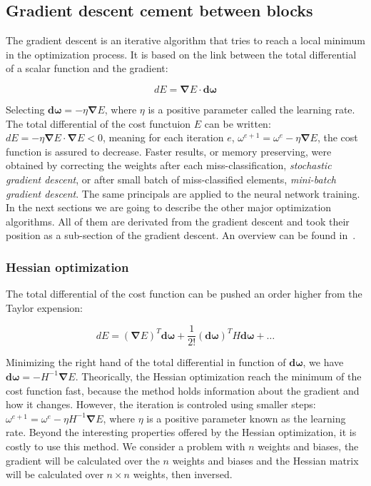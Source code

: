 \documentclass[final, paper=letter,5p,times,twocolumn]{elsarticle}
\begin{document}
\subsection{Gradient descent cement between blocks}
The gradient descent is an iterative algorithm that tries to reach a local minimum in the optimization process. It is based on the link between the total differential of a scalar function and the gradient:

$$
dE = \bm{\nabla}E \cdot \bm{d \omega}
$$

Selecting $\bm{d\omega} = -\eta \bm{\nabla}E$, where $\eta$ is a positive parameter called the learning rate. The total differential of the cost functuion $E$ can be written: $dE = -\eta \bm{\nabla}E \cdot \bm{\nabla}E < 0$, meaning for each iteration $e$, $\omega^{e+1} = \omega^{e} - \eta \bm{\nabla} E$, the cost function is assured to decrease. 
Faster results, or memory preserving, were obtained by correcting the weights after each miss-classification, {\it stochastic gradient descent}, or after small batch of miss-classified elements, {\it mini-batch gradient descent}. The same principals are applied to the neural network training.\\
In the next sections we are going to describe the other major optimization algorithms. All of them are derivated from the gradient descent and took their position as a sub-section of the gradient descent. An overview can be found in~\cite{DBLP:Ruder16}.

\subsubsection{Hessian optimization}

The total differential of the cost function can be pushed an order higher from the Taylor expension:

$$
dE = (\bm{\nabla}E)^{T} \bm{d \omega} + \frac{1}{2!}(\bm{d \omega})^{T}H\bm{d \omega} + \dots
$$

Minimizing the right hand of the total differential in function of $\bm{d \omega}$, we have $\bm{d \omega} = - H^{-1} \bm{\nabla}E$. Theorically, the Hessian optimization reach the minimum of the cost function fast, because the method holds information about the gradient and how it changes. However, the iteration is controled using smaller steps: $\omega^{e+1} = \omega^{e} - \eta  H^{-1} \bm{\nabla}E$, where $\eta$ is a positive parameter known as the learning rate. Beyond the interesting properties offered by the Hessian optimization, it is costly to use this method. We consider a problem with $n$ weights and biases, the gradient will be calculated over the $n$ weights and biases and the Hessian matrix will be calculated over $n \times n$ weights, then inversed.
\end{document}
